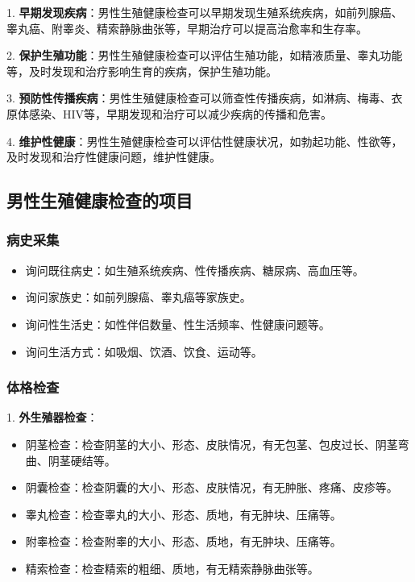 \documentclass[12pt,a4paper,twoside]{ctexbook}
\begin{document}
1. \textbf{早期发现疾病}：男性生殖健康检查可以早期发现生殖系统疾病，如前列腺癌、睾丸癌、附睾炎、精索静脉曲张等，早期治疗可以提高治愈率和生存率。

2. \textbf{保护生殖功能}：男性生殖健康检查可以评估生殖功能，如精液质量、睾丸功能等，及时发现和治疗影响生育的疾病，保护生殖功能。

3. \textbf{预防性传播疾病}：男性生殖健康检查可以筛查性传播疾病，如淋病、梅毒、衣原体感染、HIV等，早期发现和治疗可以减少疾病的传播和危害。

4. \textbf{维护性健康}：男性生殖健康检查可以评估性健康状况，如勃起功能、性欲等，及时发现和治疗性健康问题，维护性健康。

\subsection{男性生殖健康检查的项目}

\subsubsection{病史采集}

\begin{itemize}
\item 询问既往病史：如生殖系统疾病、性传播疾病、糖尿病、高血压等。
\item 询问家族史：如前列腺癌、睾丸癌等家族史。
\item 询问性生活史：如性伴侣数量、性生活频率、性健康问题等。
\item 询问生活方式：如吸烟、饮酒、饮食、运动等。
\end{itemize}

\subsubsection{体格检查}

1. \textbf{外生殖器检查}：
  \begin{itemize}
  \item 阴茎检查：检查阴茎的大小、形态、皮肤情况，有无包茎、包皮过长、阴茎弯曲、阴茎硬结等。
  \item 阴囊检查：检查阴囊的大小、形态、皮肤情况，有无肿胀、疼痛、皮疹等。
  \item 睾丸检查：检查睾丸的大小、形态、质地，有无肿块、压痛等。
  \item 附睾检查：检查附睾的大小、形态、质地，有无肿块、压痛等。
  \item 精索检查：检查精索的粗细、质地，有无精索静脉曲张等。
  \end{itemize}
\end{document}
